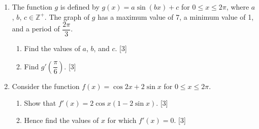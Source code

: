 \documentclass[12pt, twoside]{article}
\begin{document}
\begin{enumerate}
\newpage

\item The function $g$ is defined by $g(x) = a\sin(bx) + c$ for
$0 \leq x \leq 2\pi$, where $a$, $b$, $c \in \mathbb{Z}^+$.
The graph of $g$ has a maximum value of 7, a minimum value of 1,
and a period of $\dfrac{2\pi}{3}$.

\begin{enumerate}
\item[(a)] Find the values of $a$, $b$, and $c$. \hfill [3]
\vspace{3cm}
\item[(b)] Find $g'\!\left(\dfrac{\pi}{6}\right)$. \hfill [3]
\end{enumerate}
\vspace{3.5cm}

\item Consider the function $f(x) = \cos 2x + 2\sin x$ for $0 \leq x \leq 2\pi$.

\begin{enumerate}
\item[(a)] Show that $f'(x) = 2\cos x(1 - 2\sin x)$. \hfill [3]
\vspace{4cm}
\item[(b)] Hence find the values of $x$ for which $f'(x) = 0$. \hfill [3]
\end{enumerate}

\end{enumerate}
\end{document}
